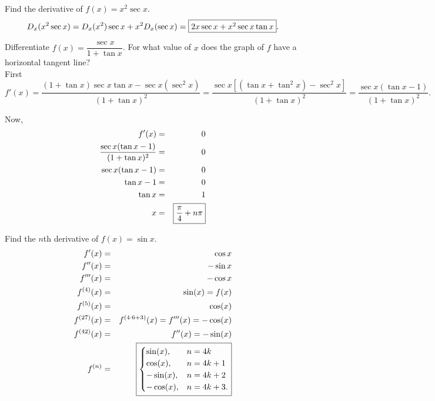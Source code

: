 \documentclass{book}
\begin{document}
\begin{Exam} Find the derivative of $f(x) = x^2\sec x$.
\[D_x(x^2\sec x) = D_x(x^2)\sec x + x^2D_x(\sec x) = \fbox{$2x\sec x + x^2\sec x \tan x$}.\]
\end{Exam}\vs

\begin{Exam} Differentiate $f(x) = \dfrac{\sec x}{1+\tan x}$. For what value of $x$ does the graph of $f$ have a horizontal tangent line?\\

First \[f'(x) = \dfrac{(1+\tan x)\sec x\tan x - \sec x(\sec^2 x)}{(1+\tan x)^2}  = \dfrac{\sec x[(\tan x + \tan^2 x) - \sec^2 x]}{(1+\tan x)^2} = \dfrac{\sec x(\tan x -1)}{(1+\tan x)^2}.\]

Now, \begin{eqnarray*}
f'(x) &=& 0\\
  \dfrac{\sec x(\tan x -1)}{(1+\tan x)^2} &=& 0\\
  \sec x(\tan x -1) &=& 0\\
  \tan x -1 &=& 0\\
   \tan x &=& 1\\
 x &=& \fbox{$\dfrac{\pi}{4} + n\pi$} 
\end{eqnarray*}
\end{Exam}\vs

\begin{Exam} Find the $n$th derivative of $f(x) = \sin x$.
\begin{eqnarray*} 
f'(x) &=& \cos x\\
f''(x) &=& -\sin x\\
f'''(x) &=& -\cos x\\
f^{(4)}(x) &=& \sin (x) = f(x)\\
f^{(5)}(x) &=& \cos (x)\\
f^{(27)}(x) &=& f^{(4\cdot 6 + 3)}(x) = f'''(x) = -\cos(x)\\
f^{(42)}(x) &=& f''(x) = -\sin (x)\\
f^{(n)} &=& \fbox{$\begin{cases} \sin(x), & n=4k\\ \cos(x), & n=4k+1\\ -\sin(x), & n=4k+2\\ -\cos(x), & n=4k+3.\end{cases}$}
\end{eqnarray*}
\end{Exam}

\vfill
{}
\pagebreak
\end{document}

